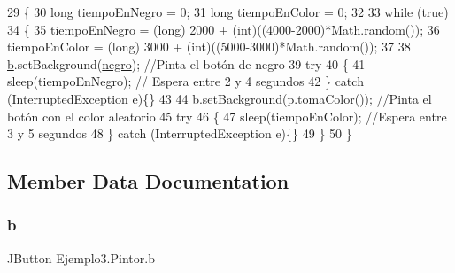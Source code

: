 \begin{DoxyCode}
29     \{
30         \textcolor{keywordtype}{long} tiempoEnNegro = 0;
31         \textcolor{keywordtype}{long} tiempoEnColor = 0;
32        
33         \textcolor{keywordflow}{while} (\textcolor{keyword}{true})
34         \{
35             tiempoEnNegro = (long) 2000 + (\textcolor{keywordtype}{int})((4000-2000)*Math.random());
36             tiempoEnColor = (long) 3000 + (\textcolor{keywordtype}{int})((5000-3000)*Math.random());
37            
38             \mbox{\hyperlink{class_ejemplo3_1_1_pintor_a6d590d2c7f652707e7ba3fc0f54e51e3}{b}}.setBackground(\mbox{\hyperlink{class_ejemplo3_1_1_pintor_a34e84683fa94d2f17767c7313c02565e}{negro}});  \textcolor{comment}{//Pinta el botón de negro}
39             \textcolor{keywordflow}{try}
40             \{
41                 sleep(tiempoEnNegro); \textcolor{comment}{// Espera entre 2 y 4 segundos}
42             \} \textcolor{keywordflow}{catch} (InterruptedException e)\{\}
43            
44             \mbox{\hyperlink{class_ejemplo3_1_1_pintor_a6d590d2c7f652707e7ba3fc0f54e51e3}{b}}.setBackground(\mbox{\hyperlink{class_ejemplo3_1_1_pintor_a737a9003af55c987971eb40fd24efbf9}{p}}.\mbox{\hyperlink{class_ejemplo3_1_1_paleta_aa20bc99fc1c973c324f038a8cb5012f8}{tomaColor}}());   \textcolor{comment}{//Pinta el botón con el color aleatorio}
45             \textcolor{keywordflow}{try}
46             \{
47                 sleep(tiempoEnColor); \textcolor{comment}{//Espera entre 3 y 5 segundos}
48             \} \textcolor{keywordflow}{catch} (InterruptedException e)\{\}
49         \}
50     \}
\end{DoxyCode}


\subsection{Member Data Documentation}
\mbox{\label{class_ejemplo3_1_1_pintor_a6d590d2c7f652707e7ba3fc0f54e51e3}} 
\subsubsection{\texorpdfstring{b}{b}}
{\footnotesize\ttfamily J\+Button Ejemplo3.\+Pintor.\+b\hspace{0.3cm}{\ttfamily [private]}}

\mbox{\label{class_ejemplo3_1_1_pintor_a34e84683fa94d2f17767c7313c02565e}} 
